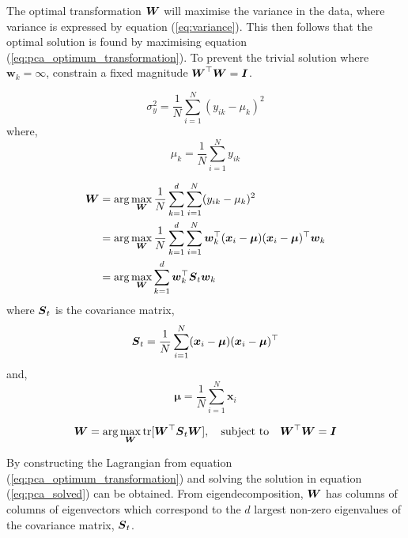 \documentclass[12pt]{report}
\begin{document}
\bigskip
The optimal transformation ${\boldsymbol{{W}}}$ will maximise the variance in the data, where variance is expressed by equation (\ref{eq:variance}).
This then follows that the optimal solution is found by maximising equation (\ref{eq:pca_optimum_transformation}).
To prevent the trivial solution where $\bm{w}_k = \infty$, constrain a fixed magnitude ${\boldsymbol{{W}}}^\top {\boldsymbol{{W}}} = {\boldsymbol{{I}}}$.


\begin{equation} \label{eq:variance}
    \sigma_y^2 = \frac{1}{N} \sum_{i=1}^{N} (y_{ik} - \mu_k)^2
\end{equation}
where,
\begin{equation*}
    \mu_k = \frac{1}{N} \sum_{i=1}^N y_{ik}
\end{equation*}

\begin{align*}
    {\boldsymbol{{W}}} &=\operatorname*{arg}\operatorname*{max}_{\boldsymbol{{W}}} 
                \frac{1}{N} \sum_{k=1}^{d} \sum_{i=1}^{N} 
                (y_{ik} - \mu_k)^2 \\
            &=\operatorname*{arg}\operatorname*{max}_{\boldsymbol{{W}}} 
                \frac{1}{N} \sum_{k=1}^{d} \sum_{i=1}^{N} 
                {\boldsymbol{{w}}}_k^\top 
                ({\boldsymbol{{x}}}_i - {\boldsymbol{{\mu}}})
                ({\boldsymbol{{x}}}_i - {\boldsymbol{{\mu}}})^\top 
                {\boldsymbol{{w}}}_k \\
            &=\operatorname*{arg}\operatorname*{max}_{\boldsymbol{{W}}} 
                \sum_{k=1}^{d}
                {\boldsymbol{{w}}}_k^\top 
                {\boldsymbol{{S}}}_t
                {\boldsymbol{{w}}}_k \\
\end{align*}
where ${\boldsymbol{{S}}}_t$ is the covariance matrix,
\begin{equation} \label{eq:covariance}
    {\boldsymbol{{S}}}_t = \frac{1}{N} \sum_{i=1}^{N} 
                ({\boldsymbol{{x}}}_i - {\boldsymbol{{\mu}}})
                ({\boldsymbol{{x}}}_i - {\boldsymbol{{\mu}}})^\top 
\end{equation}
and,
\begin{equation*}
    \bm{\mu} = \frac{1}{N} \sum_{i=1}^N \bm{x}_i
\end{equation*}


\begin{equation} \label{eq:pca_optimum_transformation}
    {\boldsymbol{{W}}} = \operatorname*{arg}\operatorname*{max}_{\boldsymbol{{W}}} 
          \operatorname{tr}[{\boldsymbol{{W}}}^\top {\boldsymbol{{S}}}_t {\boldsymbol{{W}}}],
          \quad
    \text{subject to} \quad 
    {\boldsymbol{{W}}}^\top {\boldsymbol{{W}}} = {\boldsymbol{{I}}}
\end{equation}

\bigskip
By constructing the Lagrangian from equation (\ref{eq:pca_optimum_transformation}) and solving the solution in equation (\ref{eq:pca_solved}) can be obtained.
From eigendecomposition, ${\boldsymbol{{W}}}$ has columns of columns of eigenvectors which correspond to the $d$ largest non-zero eigenvalues of the covariance matrix, ${\boldsymbol{{S}}}_t$.
\end{document}
